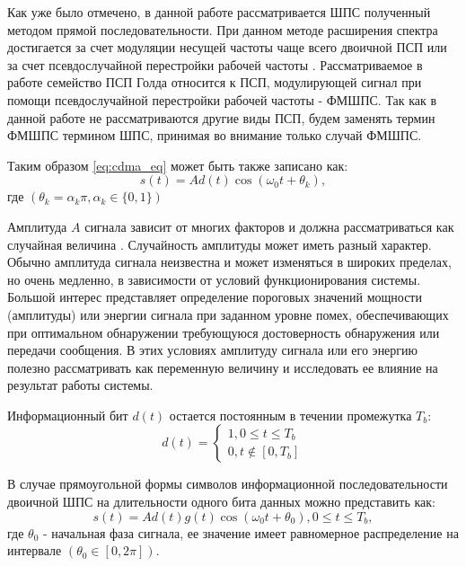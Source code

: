 Как уже было отмечено, в данной работе рассматривается ШПС полученный методом прямой последовательности. При данном методе
расширения спектра достигается за счет модуляции несущей частоты чаще всего двоичной ПСП или за счет псевдослучайной перестройки рабочей частоты \cite{borisovBook}.
Рассматриваемое в работе семейство ПСП Голда относится к ПСП, модулирующей сигнал при помощи псевдослучайной перестройки рабочей частоты - ФМШПС. Так как в данной работе
не рассматриваются другие виды ПСП, будем заменять термин ФМШПС термином ШПС, принимая во внимание только случай ФМШПС.

Таким образом \ref{eq:cdma_eq} может быть также записано как:
\begin{equation}
	\label{eq:cdma_eq_phi}
	s(t)=Ad(t)\cos{(\omega_{0}t + \theta_k)},
\end{equation}
где ${(\theta_k=\alpha_k \pi, \alpha_k \in \{0, 1\})}$

Амплитуда ${A}$ сигнала зависит от многих факторов и должна рассматриваться как случайная величина \cite{pestryakov-book}. Случайность
амплитуды может иметь разный характер. Обычно амплитуда сигнала неизвестна и может изменяться в широких пределах,
но очень медленно, в зависимости от условий функционирования системы. Большой интерес представляет определение пороговых
значений мощности (амплитуды) или энергии сигнала при заданном уровне помех, обеспечивающих при оптимальном
обнаружении требующуюся достоверность обнаружения или передачи сообщения. В этих условиях амплитуду сигнала или его энергию
полезно рассматривать как переменную величину и исследовать ее влияние на результат работы системы.

Информационный бит ${d(t)}$ остается постоянным в течении промежутка ${T_b}$:
\begin{equation}
	\label{eq:cdma_eq_data}
	 d(t) = \begin{cases}
		1, 0 \le t \le T_b \\
		0, t \not\in [0, T_b]
		\end{cases}
\end{equation}

В случае прямоугольной формы символов информационной последовательности двоичной ШПС на длительности одного бита данных можно представить как:
\begin{equation}
	\label{eq:cdma_eq_phi}
	s(t)=Ad(t)g(t)\cos{(\omega_{0}t + \theta_0)}, 0 \le t \le T_b,
\end{equation}
где ${\theta_0}$ - начальная фаза сигнала, ее значение имеет равномерное распределение на интервале ${(\theta_0 \in [0, 2\pi])}$.

